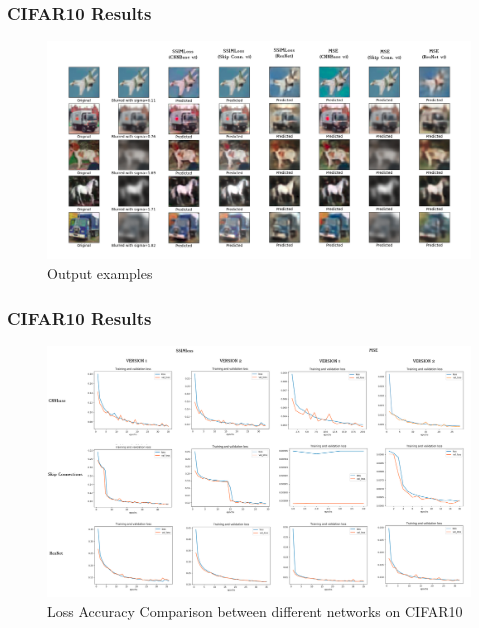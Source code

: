 \documentclass [handout] {beamer}
\begin{document}
\begin{frame}
	\frametitle{CIFAR10 Results}
	\begin{figure}[hptb]
	\centering
	\includegraphics[scale=0.19]{../Outputs_comparison.png}
	\caption{Output examples}
	\label{CIFAR10Output}
	\end{figure}
\end{frame}

\begin{frame}
	\frametitle{CIFAR10 Results}
	\begin{figure}[hptb]
	\includegraphics[scale=0.14]{../Loss_accuracy_comparison.png}
	\caption{Loss Accuracy Comparison between different networks on CIFAR10}
	\label{CIFAR10Loss}
	\end{figure}
\end{frame}
\end{document}
